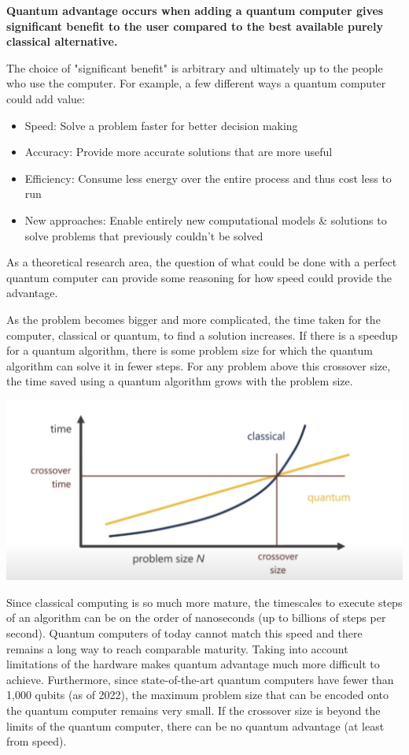 \documentclass{book}
\begin{document}
\textbf{Quantum advantage occurs when adding a quantum computer gives significant benefit to the user compared to the best available purely classical alternative.} 

The choice of "significant benefit" is arbitrary and ultimately up to the people who use the computer. For example, a few different ways a quantum computer could add value: 

\begin{itemize}
    \item Speed: Solve a problem faster for better decision making
    \item Accuracy: Provide more accurate solutions that are more useful 
    \item Efficiency: Consume less energy over the entire process and thus cost less to run 
    \item New approaches: Enable entirely new computational models \& solutions to solve problems that previously couldn't be solved
\end{itemize}
    
As a theoretical research area, the question of what could be done with a perfect quantum computer can provide some reasoning for how speed could provide the advantage. 



As the problem becomes bigger and more complicated, the time taken for the computer, classical or quantum, to find a solution increases. If there is a speedup for a quantum algorithm, there is some problem size for which the quantum algorithm can solve it in fewer steps. For any problem above this crossover size, the time saved using a quantum algorithm grows with the problem size. 

\includegraphics[scale = 0.5]{images/Q_advantage.png}

Since classical computing is so much more mature, the timescales to execute steps of an algorithm can be on the order of nanoseconds (up to billions of steps per second). Quantum computers of today cannot match this speed and there remains a long way to reach comparable maturity. Taking into account limitations of the hardware makes quantum advantage much more difficult to achieve. Furthermore, since state-of-the-art quantum computers have fewer than 1,000 qubits (as of 2022), the maximum problem size that can be encoded onto the quantum computer remains very small. If the crossover size is beyond the limits of the quantum computer, there can be no quantum advantage (at least from speed). 
\end{document}
